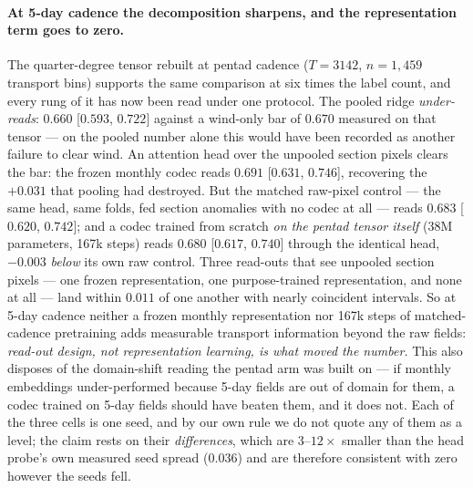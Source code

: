 \documentclass[10pt]{article}
\begin{document}
\paragraph{At 5-day cadence the decomposition sharpens, and the
representation term goes to zero.} The quarter-degree tensor rebuilt at
pentad cadence ($T{=}3142$, $n{=}1{,}459$ transport bins) supports the
same comparison at six times the label count, and every rung of it has
now been read under one protocol. The pooled ridge \emph{under-reads}:
$0.660$ [$0.593$, $0.722$] against a wind-only bar of $0.670$ measured on
that tensor --- on the pooled number alone this would have been recorded
as another failure to clear wind. An attention head over the unpooled
section pixels clears the bar: the frozen monthly codec reads $0.691$
[$0.631$, $0.746$], recovering the $+0.031$ that pooling had destroyed.
But the matched raw-pixel control --- the same head, same folds, fed
section anomalies with no codec at all --- reads $0.683$ [$0.620$,
$0.742$]; and a codec trained from scratch \emph{on the pentad tensor
itself} (38M parameters, 167k steps) reads $0.680$ [$0.617$, $0.740$]
through the identical head, $-0.003$ \emph{below} its own raw control.
Three read-outs that see unpooled section pixels --- one frozen
representation, one purpose-trained representation, and none at all ---
land within $0.011$ of one another with nearly coincident intervals. So
at 5-day cadence neither a frozen monthly representation nor 167k steps
of matched-cadence pretraining adds measurable transport information
beyond the raw fields: \emph{read-out design, not representation
learning, is what moved the number.} This also disposes of the
domain-shift reading the pentad arm was built on --- if monthly
embeddings under-performed because 5-day fields are out of domain for
them, a codec trained on 5-day fields should have beaten them, and it
does not. Each of the three cells is one seed, and by our own rule we do
not quote any of them as a level; the claim rests on their
\emph{differences}, which are $3$--$12\times$ smaller than the head
probe's own measured seed spread ($0.036$) and are therefore consistent
with zero however the seeds fell.
\end{document}
